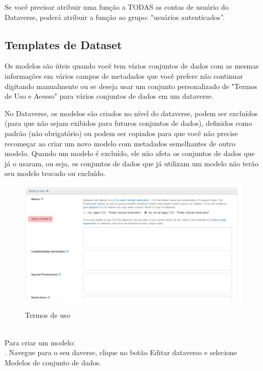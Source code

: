\documentclass[12pt,hidelinks]{article}
\begin{document}
Se você precisar atribuir uma função a TODAS as contas de usuário do Dataverse, poderá atribuir a função ao grupo: "usuários autenticados”.
        
    \subsection{Templates de Dataset}
    
\qquad Os modelos são úteis quando você tem vários conjuntos de dados com as mesmas informações em vários campos de metadados que você prefere não continuar digitando manualmente ou se deseja usar um conjunto personalizado de "Termos de Uso e Acesso" para vários conjuntos de dados em um dataverse. 

No Dataverse, os modelos são criados no nível do dataverse, podem ser excluídos (para que não sejam exibidos para futuros conjuntos de dados), definidos como padrão (não obrigatório) ou podem ser copiados para que você não precise recomeçar ao criar um novo modelo com metadados semelhantes de outro modelo. Quando um modelo é excluído, ele não afeta os conjuntos de dados que já o usaram, ou seja, os conjuntos de dados que já utilizam um modelo não terão seu modelo trocado ou excluído.\\

 \begin{figure}[H]
  \caption{Termos de uso}
\centering
    \includegraphics[width=1.0\textwidth]{Prints/pn1.png}
    \label{print6}
\end{figure}
\\

Para criar um modelo:\\

. Navegue para o seu daverse, clique no botão Editar dataverso e selecione Modelos de conjunto de dados.\\
\end{document}
